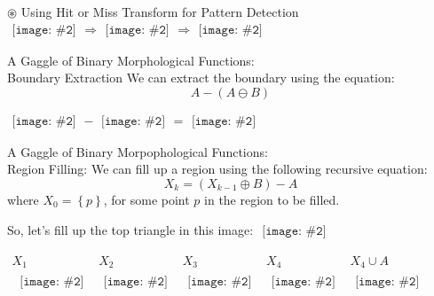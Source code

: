 \documentclass{beamer}
\newcommand{\pic}[2]{
     \begin{array}{l}
      \texttt{[image: \#2]}
      \end{array}
}
\newcommand{\set}[1]{\left\lbrace #1 \right\rbrace}
\newcommand{\union}{\cup}
\newcommand{\dilate}{\oplus}
\newcommand{\erode}{\ominus}
\newcommand{\hitmiss}{\circledast}
\begin{document}
\begin{frame}{$\hitmiss$ Using Hit or Miss Transform for Pattern Detection}
  $\pic{width=75pt}{images/tux_coolhamblenhitmiss.png} 
   \Rightarrow \pic{width=75pt}{images/tux_coolhamblenhitmisstransformed.png}
   \Rightarrow \pic{width=75pt}{images/tux_coolhamblenhitmisstransformeddilate.png}
$


\end{frame}
\begin{frame}{A Gaggle of  Binary Morphological Functions:\\
              Boundary Extraction}
We can extract the boundary using the equation:
$$A - (A \erode B)$$

$\pic{width=75pt}{images/binarycoolhamblen.png}
 -
 \pic{width=75pt}{images/coolhamblen_eroded.png}
 =
 \pic{width=75pt}{images/coolhamblen_boundary.png}$

\end{frame}
\begin{frame}{A Gaggle of Binary Morpophological Functions:\\
              Region Filling:}
  We can fill up a region using the following recursive equation:
  $$X_k=(X_{k-1}\dilate B)-A$$
  where $X_0 = \set{p}$, for some point $p$ in the region to be filled.

  So, let's fill up the top triangle in this image: 
  $\pic{width=20pt}{images/triangles.png}$

$
    \begin{array}{c|c|c|c|c|c}
     X_1 & X_2 & X_3 & X_4 & X_4 \union A\\\
     \pic{width=20pt}{images/triangles1.png}
     &\pic{width=20pt}{images/triangles2.png}
     &\pic{width=20pt}{images/triangles3.png}
     &\pic{width=20pt}{images/triangles4.png}
     &\pic{width=20pt}{images/trianglesfilled.png}
   \end{array}$
 

\end{frame}
\end{document}
